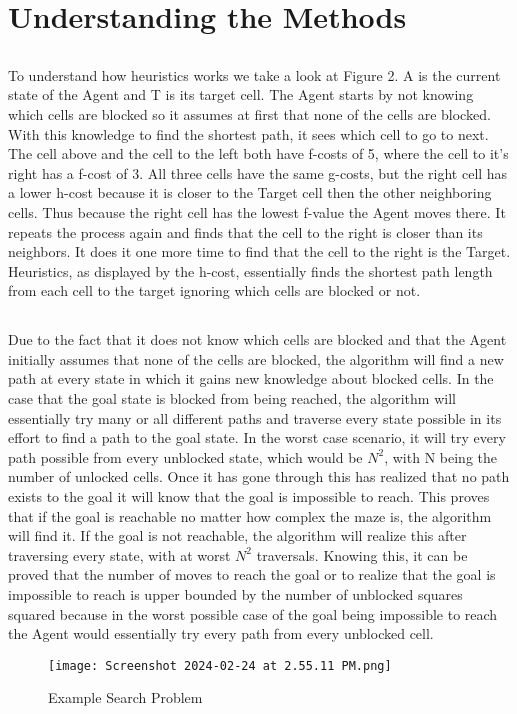 \documentclass{article}
\begin{document}
    \section{Understanding the Methods}
    \subsection{}To understand how heuristics works we take a look at Figure 2. A is the current state of the Agent and T is its target cell. The Agent starts by not knowing which cells are blocked so it assumes at first that none of the cells are blocked. With this knowledge to find the shortest path, it sees which cell to go to next. The cell above and the cell to the left both have f-costs of 5, where the cell to it's right has a f-cost of 3. All three cells have the same g-costs, but the right cell has a lower h-cost because it is closer to the Target cell then the other neighboring cells. Thus because the right cell has the lowest f-value the Agent moves there. It repeats the process again and finds that the cell to the right is closer than its neighbors. It does it one more time to find that the cell to the right is the Target. Heuristics, as displayed by the h-cost, essentially finds the shortest path length from each cell to the target ignoring which cells are blocked or not. 
    \subsection{}Due to the fact that it does not know which cells are blocked and that the Agent initially assumes that none of the cells are blocked, the algorithm will find a new path at every state in which it gains new knowledge about blocked cells. In the case that the goal state is blocked from being reached, the algorithm will essentially try many or all different paths and traverse every state possible in its effort to find a path to the goal state. In the worst case scenario, it will try every path possible from every unblocked state, which would be \(N^2\), with N being the number of unlocked cells.
    \newline
    \newline
    Once it has gone through this has realized that no path exists to the goal it will know that the goal is impossible to reach. This proves that if the goal is reachable no matter how complex the maze is, the algorithm will find it. If the goal is not reachable, the algorithm will realize this after traversing every state, with at worst \(N^2\) traversals. Knowing this, it can be proved that the number of moves to reach the goal or to realize that the goal is impossible to reach is upper bounded by the number of unblocked squares squared because in the worst possible case of the goal being impossible to reach the Agent would essentially try every path from every unblocked cell.
\begin{figure}[h]
    \centering
    \texttt{[image: Screenshot 2024-02-24 at 2.55.11 PM.png]}
    \caption{Example Search Problem}
    \label{fig:example}
\end{figure}
\end{document}
